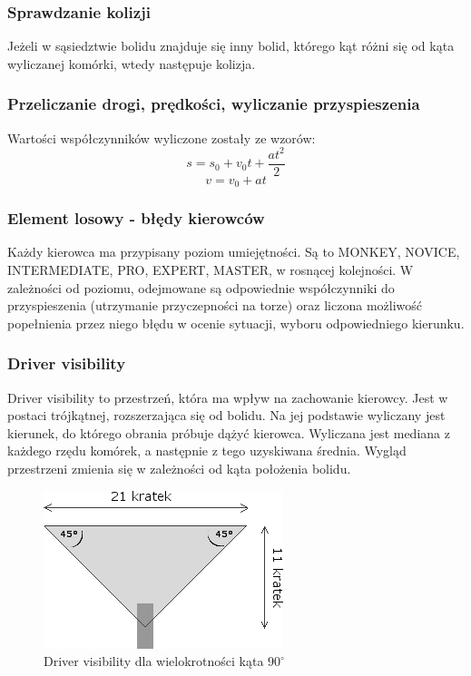\documentclass{article}
\begin{document}
\subsubsection{Sprawdzanie kolizji}
Jeżeli w sąsiedztwie bolidu znajduje się inny bolid, którego kąt różni się od kąta wyliczanej komórki, wtedy następuje kolizja.

\subsubsection{Przeliczanie drogi, prędkości, wyliczanie przyspieszenia}
Wartości współczynników wyliczone zostały ze wzorów:
$$
s = s_{0} + v_{0}t + \frac{at^{2}}{2}
$$
$$
v = v_{0} + at
$$

\subsubsection{Element losowy - błędy kierowców}
Każdy kierowca ma przypisany poziom umiejętności. Są to MONKEY, NOVICE, INTERMEDIATE, PRO, EXPERT, MASTER, w rosnącej kolejności. W zależności od poziomu, odejmowane są odpowiednie współczynniki do przyspieszenia (utrzymanie przyczepności na torze) oraz liczona możliwość popełnienia przez niego błędu w ocenie sytuacji, wyboru odpowiedniego kierunku.

\subsubsection{Driver visibility}
Driver visibility to przestrzeń, która ma wpływ na zachowanie kierowcy. Jest w postaci trójkątnej, rozszerzająca się od bolidu. Na jej podstawie wyliczany jest kierunek, do którego obrania próbuje dążyć kierowca. Wyliczana jest mediana z każdego rzędu komórek, a następnie z tego uzyskiwana średnia. Wygląd przestrzeni zmienia się w zależności od kąta położenia bolidu.\\

\begin{figure}[h]
\begin{center}
\includegraphics[scale=0.6]{visibility-top.png}
\caption{Driver visibility dla wielokrotności kąta $90^{\circ}$}
\end{center}
\end{figure}
\end{document}
